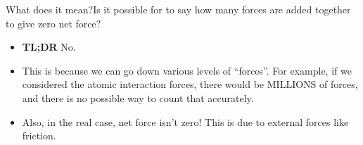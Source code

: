 \documentclass{beamer}
\begin{document}
\begin{frame}{What does it mean?}{Is it possible for to say how many forces are added together to give zero net force?}
\begin{itemize}
\item \textbf{TL;DR} No.
\item This is because we can go down various levels of ``forces''. For example, if we considered the atomic interaction forces, there would be MILLIONS of forces, and there is no possible way to count that accurately.
\item Also, in the real case, net force isn't zero! This is due to external forces like friction.
\end{itemize}
\end{frame}



%
%

%
\end{document}
